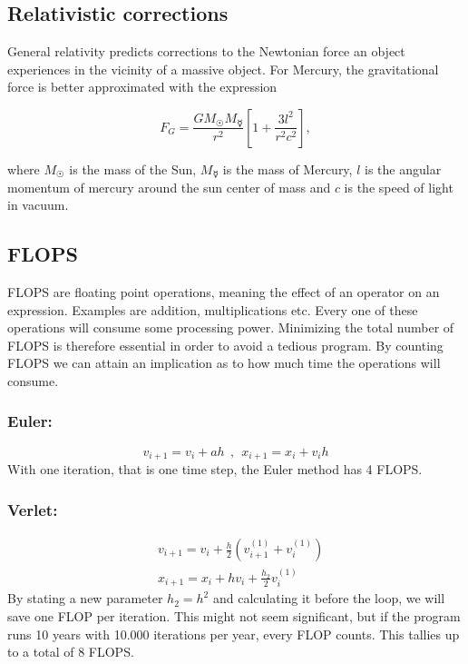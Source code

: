 \documentclass[10pt]{article}
\begin{document}
\begin{multicols}{2}
\subsection{Relativistic corrections}
General relativity predicts corrections to the Newtonian force an object
experiences in the vicinity of a massive object. For Mercury, the
gravitational force is better approximated with the expression

\begin{equation}
    F_G = \frac{GM_{\Sun}M_{\Mercury}}{r^2}
    \left[1+\frac{3l^2}{r^2 c^2}\right] ,
\end{equation}

where  $M_\Sun$ is the mass of the Sun, $M_\Mercury$ is the
mass of Mercury, $l$ is the angular momentum of mercury around the sun
center of mass and $c$ is the speed of light in vacuum. 

\subsection{FLOPS}
FLOPS are floating point operations, meaning the effect of an operator on
an expression. Examples are addition, multiplications etc. Every one of
these operations will consume some processing power. Minimizing the total
number of FLOPS is therefore essential in order to avoid a tedious program.
By counting FLOPS we can attain an implication as to how much time the
operations will consume.
\subsubsection{Euler:} 
\begin{equation}
    \boxed{v_{i+1}=v_i+ah}\ \ , \ \ \boxed{x_{i+1}=x_i+v_ih} 
\end{equation}
With one iteration, that is one time step, the Euler method has 4 FLOPS.

\subsubsection{Verlet:}
\begin{align}
    &\boxed{v_{i+1}=v_i+\frac{h}{2}\left(v_{i+1}^{(1)}+v_{i}^{(1)}\right)}\nonumber\\
    &\boxed{x_{i+1}=x_i+hv_i + \frac{h_2}{2} v_{i}^{(1)}}
\end{align}
By stating a new parameter $h_2 = h^2$ and calculating it before the loop,
we will save one FLOP per iteration. This might not seem significant, but
if the program runs 10 years with 10.000 iterations per year, every FLOP
counts. This tallies up to a total of 8 FLOPS.


\end{multicols}
\end{document}
